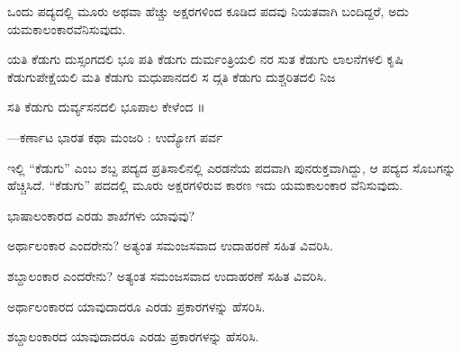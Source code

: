 
\indent ಒಂದು ಪದ್ಯದಲ್ಲಿ ಮೂರು ಅಥವಾ ಹೆಚ್ಚು ಅಕ್ಷರಗಳಿಂದ ಕೂಡಿದ ಪದವು ನಿಯತವಾಗಿ ಬಂದಿದ್ದರೆ, ಅದು ಯಮಕಾಲಂಕಾರವೆನಿಸುವುದು.\par

\noindent\hspace*{1.2em}\hspace{0.6em}ಯತಿ ಕೆಡುಗು ದುಸ್ಸಂಗದಲಿ ಭೂ ಪತಿ ಕೆಡುಗು ದುರ್ಮಂತ್ರಿಯಲಿ ನರ ಸುತ ಕೆಡುಗು ಲಾಲನೆಗಳಲಿ ಕೃಷಿ ಕೆಡುಗುಪೇಕ್ಷೆಯಲಿ ಮತಿ ಕೆಡುಗು ಮಧುಪಾನದಲಿ ಸ ದ್ಗತಿ ಕೆಡುಗು ದುಶ್ಚರಿತದಲಿ ನಿಜ\par

\begin{kbvverse}
\noindent ಸತಿ ಕೆಡುಗು ದುರ್ವ್ಯಸನದಲಿ ಭೂಪಾಲ ಕೇಳೆಂದ ॥
\end{kbvverse}

\noindent\hfill{\fontsize{9.5pt}{12.5pt}\selectfont\color{kbvgrey}—ಕರ್ಣಾಟ ಭಾರತ ಕಥಾ ಮಂಜರಿ : ಉದ್ಯೋಗ ಪರ್ವ}\par\vspace{3pt plus 2pt}

\indent ಇಲ್ಲಿ “ಕೆಡುಗು” ಎಂಬ ಶಬ್ದ ಪದ್ಯದ ಪ್ರತಿಸಾಲಿನಲ್ಲಿ ಎರಡನೆಯ ಪದವಾಗಿ ಪುನರುಕ್ತವಾಗಿದ್ದು, ಆ ಪದ್ಯದ ಸೊಬಗನ್ನು ಹೆಚ್ಚಿಸಿದೆ. “ಕೆಡುಗು” ಪದದಲ್ಲಿ ಮೂರು ಅಕ್ಷರಗಳಿರುವ ಕಾರಣ ಇದು ಯಮಕಾಲಂಕಾರ ವೆನಿಸುವುದು.\par


\vspace{2.5pt plus 3pt minus 0.5pt}\noindent\hspace*{1.2em}\hspace{0.55em}ಭಾಷಾಲಂಕಾರದ ಎರಡು ಶಾಖೆಗಳು ಯಾವುವು?\par

\vspace{2.5pt plus 3pt minus 0.5pt}\noindent\hspace*{1.2em}\hspace{0.55em}ಅರ್ಥಾಲಂಕಾರ ಎಂದರೇನು? ಅತ್ಯಂತ ಸಮಂಜಸವಾದ ಉದಾಹರಣೆ ಸಹಿತ ವಿವರಿಸಿ.\par

\vspace{2.5pt plus 3pt minus 0.5pt}\noindent\hspace*{1.2em}\hspace{0.55em}ಶಬ್ದಾಲಂಕಾರ ಎಂದರೇನು? ಅತ್ಯಂತ ಸಮಂಜಸವಾದ ಉದಾಹರಣೆ ಸಹಿತ ವಿವರಿಸಿ.\par

\vspace{2.5pt plus 3pt minus 0.5pt}\noindent\hspace*{1.2em}\hspace{0.55em}ಅರ್ಥಾಲಂಕಾರದ ಯಾವುದಾದರೂ ಎರಡು ಪ್ರಕಾರಗಳನ್ನು ಹೆಸರಿಸಿ.\par

\vspace{2.5pt plus 3pt minus 0.5pt}\noindent\hspace*{1.2em}\hspace{0.55em}ಶಬ್ದಾಲಂಕಾರದ ಯಾವುದಾದರೂ ಎರಡು ಪ್ರಕಾರಗಳನ್ನು ಹೆಸರಿಸಿ.\par
